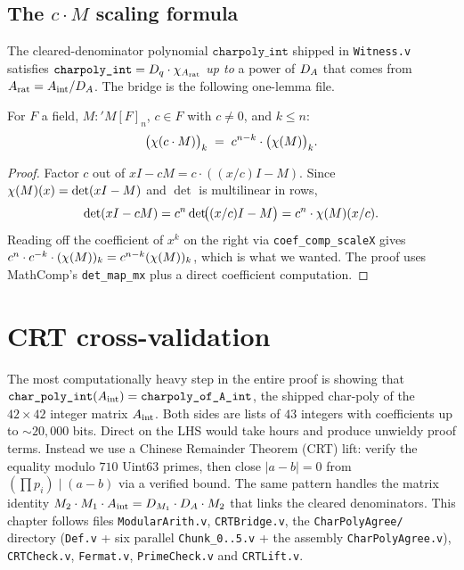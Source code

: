 \section{The \texorpdfstring{$c \cdot M$}{c.M} scaling formula}

The cleared-denominator polynomial $\texttt{charpoly\_int}$ shipped in
\texttt{Witness.v} satisfies
$\texttt{charpoly\_int} = D_q \cdot \chi_{A_{\mathrm{rat}}}$ \emph{up to} a
power of $D_A$ that comes from $A_{\mathrm{rat}} = A_{\mathrm{int}} / D_A$. The bridge is the
following one-lemma file.

\begin{lemma}\label{lem:char_poly_scale}
\rocqok
For $F$ a field, $M : 'M[F]_n$, $c \in F$ with $c \ne 0$, and
$k \le n$:
\[
\bigl(\chi(c \cdot M)\bigr)_k
   \;=\; c^{n - k} \cdot \bigl(\chi(M)\bigr)_k.
\]
\end{lemma}
\begin{proof}\rocqok
Factor $c$ out of $xI - cM = c \cdot ((x/c) I - M)$. Since
$\chi(M)(x) = \det(xI - M)$ and $\det$ is multilinear in rows,
\[
\det(xI - cM) = c^n \det\!\bigl((x/c) I - M\bigr) = c^n \cdot \chi(M)(x/c).
\]
Reading off the coefficient of $x^k$ on the right via
\texttt{coef\_comp\_scaleX} gives
$c^n \cdot c^{-k} \cdot (\chi(M))_k = c^{n - k} (\chi(M))_k$,
which is what we wanted. The proof uses MathComp's
\texttt{det\_map\_mx} plus a direct coefficient computation.
\end{proof}

\chapter{CRT cross-validation}\label{ch:crt}

The most computationally heavy step in the entire proof is showing that
$\texttt{char\_poly\_int}(A_{\mathrm{int}}) = \texttt{charpoly\_of\_A\_int}$, the
shipped char-poly of the $42 \times 42$ integer matrix $A_{\mathrm{int}}$. Both
sides are lists of $43$ integers with coefficients up to ${\sim}20{,}000$
bits. Direct \vmcompute{} on the LHS would take hours and produce
unwieldy proof terms. Instead we use a Chinese Remainder Theorem (CRT)
lift: verify the equality modulo $710$ Uint63 primes, then close
$|a - b| = 0$ from $(\prod p_i) \mid (a - b)$ via a verified bound. The
same pattern handles the matrix identity $M_2 \cdot M_1 \cdot A_{\mathrm{int}}
= D_{M_1} \cdot D_A \cdot M_2$ that links the cleared denominators.
This chapter follows files \texttt{ModularArith.v}, \texttt{CRTBridge.v},
the \texttt{CharPolyAgree/} directory (\texttt{Def.v} + six parallel
\texttt{Chunk\_0..5.v} + the assembly \texttt{CharPolyAgree.v}),
\texttt{CRTCheck.v}, \texttt{Fermat.v}, \texttt{PrimeCheck.v} and
\texttt{CRTLift.v}.

